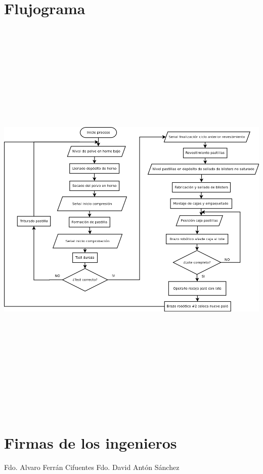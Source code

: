 \section{Flujograma}
\includegraphics[width=15cm,height=20cm,keepaspectratio]{Planos/Flujograma.png}



\newpage\section {Firmas de los ingenieros}
\vspace{5cm}
Fdo. Alvaro Ferrán Cifuentes
\vspace{5cm}\hspace{5cm}
Fdo. David Antón Sánchez

